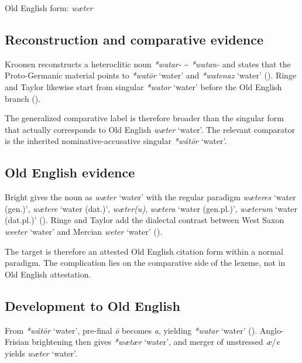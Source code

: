 \documentclass[
  british,
  a4paper,
  openany]{book}
\providecommand{\Recon}[1]{\emph{*#1}}
{\catcode`→=\active \global\def→{\ensuremath{\rightarrow}}}
\providecommand{\Recon}[1]{\emph{*#1}}
{\catcode`→=\active \global\def→{\ensuremath{\rightarrow}}}
\begin{document}
Old English form: \emph{wæter}

\subsection{Reconstruction and comparative
evidence}\label{reconstruction-and-comparative-evidence-102}

Kroonen reconstructs a heteroclitic noun \emph{*watar-}
\textasciitilde{} \emph{*watan-} and states that the Proto-Germanic
material points to \Recon{watōr} `water' and \Recon{watenaz} `water'
(). Ringe and Taylor
likewise start from singular \Recon{wator} `water' before the Old
English branch ().

The generalized comparative label is therefore broader than the singular
form that actually corresponds to Old English {\emph{wæter}} `water'.
The relevant comparator is the inherited nominative-accusative singular
{\Recon{wátōr} `water'}.

\subsection{Old English evidence}\label{old-english-evidence-102}

Bright gives the noun as {\emph{wæter}} `water' with the regular
paradigm {\emph{wæteres}} `water (gen.)', {\emph{wætere}} `water
(dat.)', \emph{wæter(u)}, {\emph{wætera}} `water (gen.pl.)',
{\emph{wæterum}} `water (dat.pl.)'
(). Ringe and
Taylor add the dialectal contrast between West Saxon \emph{weeter}
`water' and Mercian \emph{weter} `water'
().

The target is therefore an attested Old English citation form within a
normal paradigm. The complication lies on the comparative side of the
lexeme, not in Old English attestation.

\subsection{Development to Old
English}\label{development-to-old-english-102}

From \Recon{wátōr} `water', pre-final \emph{ō} becomes \emph{a},
yielding \Recon{watar} `water' (). Anglo-Frisian brightening then gives
\Recon{wætær} `water', and merger of unstressed \emph{æ}/\emph{e} yields
{\emph{wæter}} `water'.
\end{document}
